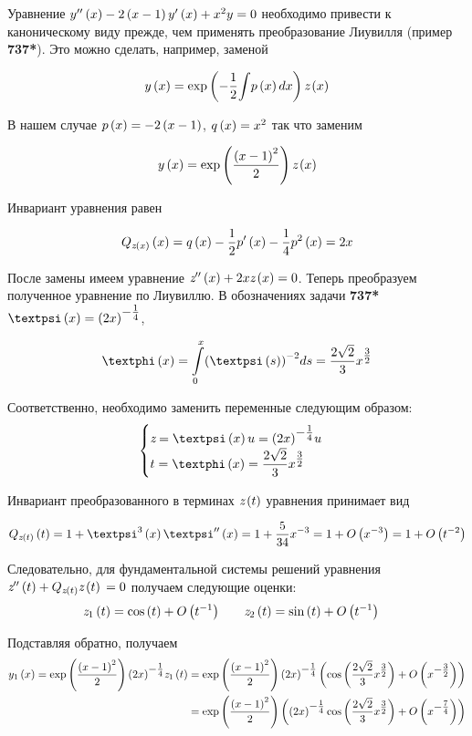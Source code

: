 \documentclass[a5paper,10pt]{article}
\begin{document}
Уравнение $y''\left(x\right) - 2\left(x - 1\right) y'\left(x\right) + x^{2} y = 0$ необходимо привести к каноническому виду прежде, чем применять преобразование Лиувилля (пример \textbf{737*}). Это можно сделать, например, заменой 

$$y\left(x\right) = \exp \left(- \frac {1} {2} \displaystyle{\int} {p\left(x\right) dx} \right) \textit{z}\left(x\right) $$

В нашем случае $p\left(x\right) = -2\left(x - 1\right)$, $q\left(x\right) = x^2$ так что заменим 

$$y\left(x\right) = \exp\left(\frac {\left(x - 1\right)^2} {2}\right) \textit{z}\left(x\right)$$

Инвариант уравнения равен

$$Q_{\textit{z}\left(x\right)} \left(x\right) = q\left(x\right) - \frac {1} {2} p'\left(x\right) - \frac {1} {4} p^{2}\left(x\right) = 2x$$

После замены имеем уравнение $\textit{z}''\left(x\right) + 2x \textit{z}\left(x\right) = 0$. Теперь преобразуем полученное уравнение по Лиувиллю. В обозначениях задачи \textbf{737*} $\psi\br{x} = \tpow {\br{2x}} {-\frac {1} {4}}$,

$$\phi\br{x} = \tintlim{0}{x} {\br{\psi\br{s}}^{-2}} ds = \frac {2\sqrt{2}} {3} \tpow{x}{\frac {3} {2}}$$

Соответственно, необходимо заменить переменные следующим образом:
$$
\begin{cases}
\zed = \psi\br{x} u = \tpow {\br{2x}} {-\frac {1} {4}} u \\
t = \phi\br{x} = \dfrac {2\sqrt{2}} {3} \tpow {x} {\frac {3} {2}}
\end{cases}
$$

Инвариант преобразованного в терминах $\textit{z}\left(t\right)$ уравнения принимает вид

$$Q_{\zed\br{t}}\br{t} = 1 + \psi^3\br{x} \psi''\br{x} = 1 + \frac {5} {34} x^{-3} = 1 + O\br{x^{-3}} = 1 + O\br{t^{-2}}$$

Следовательно, для фундаментальной системы решений уравнения $\textit{z}''\left(t\right) + Q_{\textit{z}\left(t\right)} \textit{z}\left(t\right) \\ = 0$ получаем следующие оценки:
\begin{align*}
\textit{z}_{1}\left(t\right) = \cos\left(t\right) + O\left(t^{-1}\right) \qquad & \textit{z}_{2}\left(t\right) = \sin\left(t\right) + O\left(t^{-1}\right)
\end{align*}

Подставляя обратно, получаем
\begin{align*}
  y_{1}\br{x} = \exp\br{\frac {\br{x - 1}^2} {2}} \tpow {\br{2x}}{-\frac {1} {4}} \zed_{1}\br{t}
  = \exp\br{\frac {\br{x - 1}^2} {2}} \tpow {\br{2x}}{-\frac {1} {4}} \br{\cos\br{\frac {2\sqrt{2}} {3} \tpow{x}{\frac {3} {2}}} + O\br{\tpow {x} {-\frac {3} {2}}}} \\ 
  = \exp\br{\frac {\br{x - 1}^2} {2}} \br{ \tpow {\br{2x}}{-\frac {1} {4}} \cos\br{\frac {2\sqrt{2}} {3} \tpow{x}{\frac {3} {2}}} + O\br{\tpow{x} {-\frac {7} {4}}}}
\end{align*}
\end{document}
